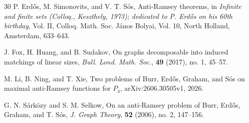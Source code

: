 \documentclass[11pt,a4paper]{article}
\begin{document}
\begin{thebibliography}{30}
 P. Erd\H{o}s, M. Simonovits, and V. T. S\'{o}s, Anti-Ramsey theorems, in \emph{Infinite and finite sets (Colloq., Keszthely, 1973); dedicated to P. Erdős on his 60th birthday}, Vol. II, Colloq. Math. Soc. J\'{a}nos Bolyai, Vol. 10, North Holland, Amsterdam, 633--643.





 J. Fox, H. Huang, and B. Sudakov, On graphs decomposable into induced matchings of linear sizes, \emph{Bull. Lond. Math. Soc.}, \textbf{49} (2017), no. 1, 45--57.



 M. Li, B. Ning, and T. Xie, Two problems of Burr, Erd\H{o}s, Graham, and S\'{o}s on maximal anti-Ramsey functions for $P_4$, arXiv:2606.30505v1, 2026.


 G. N. Sárközy and S. M. Selkow, On an anti-Ramsey problem of Burr, Erd\H{o}s, Graham, and T. S\'{o}s, \emph{J. Graph Theory}, \textbf{52} (2006), no. 2, 147--156.



\end{thebibliography}
\end{document}
